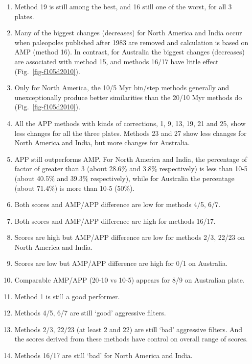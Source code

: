 \begin{enumerate}
  \item Method 19 is still among the best, and 16 still one of the worst, for
		all 3 plates.
  \item Many of the biggest changes (decreases) for North America and India
		occur when paleopoles published after 1983 are removed and calculation
		is based on AMP (method 16). In contrast, for Australia the biggest
		changes (decreases) are associated with method 15, and methods 16/17
		have little effect (Fig.~\ref{fig-f105d2010}).
  \item Only for North America, the 10/5 Myr bin/step methods generally and
		unexceptionally produce better similarities than the 20/10 Myr methods
		do (Fig.~\ref{fig-f105d2010}).
  \item All the APP methods with kinds of corrections, 1, 9, 13, 19, 21 and 25,
		show less changes for all the three plates. Methods 23 and 27 show less
		changes for North America and India, but more changes for Australia.
  \item APP still outperforms AMP\@. For North America and India, the percentage
		of factor of greater than 3 (about 28.6\% and 3.8\% respectively) is
		less than 10-5 (about 40.5\% and 39.3\% respectively), while for
		Australia the percentage (about 71.4\%) is more than 10-5 (50\%).
  \item Both scores and AMP/APP difference are low for methods 4/5, 6/7.
  \item Both scores and AMP/APP difference are high for methods 16/17.
  \item Scores are high but AMP/APP difference are low for methods 2/3, 22/23
		on North America and India.
  \item Scores are low but AMP/APP difference are high for 0/1 on Australia.
  \item Comparable AMP/APP (20-10 vs 10-5) appears for 8/9 on Australian plate.
  \item Method 1 is still a good performer.
  \item Methods 4/5, 6/7 are still `good' aggressive filters.
  \item Methods 2/3, 22/23 (at least 2 and 22) are still `bad' aggressive
		filters. And the scores derived from these methods have control on
		overall range of scores.
  \item Methods 16/17 are still `bad' for North America and India.
\end{enumerate}

